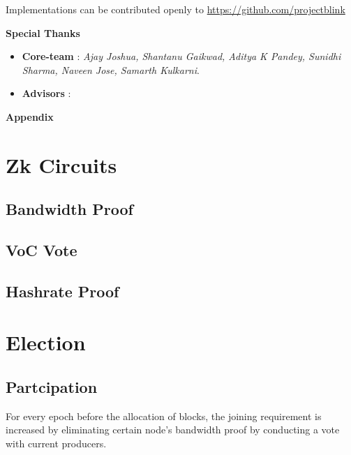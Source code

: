 \documentclass[a4paper,10pt]{article}
\begin{document}
\noindent Implementations can be contributed openly to \url{https://github.com/projectblink}
\nocite{nakamoto2008bitcoin} \nocite{poon2016bitcoin}  \nocite{yakovenko2018solana} \nocite{wood2014ethereum}



\noindent \textbf{Special Thanks}
\begin{itemize}
\item \textbf{Core-team} : \textit{Ajay Joshua, Shantanu Gaikwad, Aditya K Pandey, Sunidhi Sharma, Naveen Jose, Samarth Kulkarni}. 
\item \textbf{Advisors} : 
\end{itemize}

\newpage
\appendix
\noindent \Large \textbf{Appendix}
\normalsize
\section{Zk Circuits}
\subsection{Bandwidth Proof}
\subsection{VoC Vote}
\subsection{Hashrate Proof}
\section{Election}

\subsection{Partcipation}

For every epoch before the allocation of blocks, the joining  requirement is increased by eliminating certain node's bandwidth proof by conducting a vote with current producers.
\end{document}
